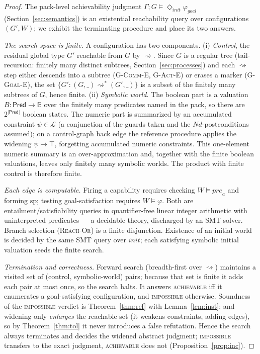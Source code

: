 \documentclass{article}
\theoremstyle{plain}
\theoremstyle{definition}
\newcommand{\reach}{\rightsquigarrow}
\newcommand{\reachs}{\reach^{*}}
\newcommand{\Pred}{\mathsf{Pred}}
\newcommand{\pre}{\mathit{pre}}
\newcommand{\Nd}{\mathit{Nd}}
\newcommand{\seither}{\mathrm{sp}}
\newcommand{\gphi}{\varphi_{\mathit{goal}}}
\newcommand{\achinit}{\vDash\Diamond_{\mathit{init}}}
\def \bgc {}
\def \egc {}
\begin{document}
\begin{proof}
The pack-level achievability judgment $\Gamma;G\achinit\gphi$
(Section~\ref{sec:semantics}) is an existential reachability query over
configurations $(G',W)$; \bgc we exhibit the terminating procedure and place
its two answers\egc.

\emph{The search space is finite.} A configuration has two components.
(i) \emph{Control}, the residual global type $G'$ reachable from $G$ by
$\reach$. Since $G$ is a regular tree (tail-recursion: finitely many distinct
subtrees, Section~\ref{sec:processes}) and each $\reach$ step either descends
into a subtree
(\textsc{G-Comm-E}, \textsc{G-Act-E}) or erases a marker (\textsc{G-Goal-E}), the set
$\{G' : (G,\_)\reachs(G',\_)\}$ is a subset of the finitely many subtrees of $G$,
hence finite. (ii) \emph{Symbolic world}. The boolean part is a valuation
$B:\Pred\to\mathbb B$ over the finitely many predicates named in the pack, so there
are $2^{|\Pred|}$ boolean states. The numeric part is summarized by an accumulated
constraint $\psi\in\mathcal L$ (a conjunction of the guards taken and the
$\Nd$-postconditions assumed); on a control-graph back edge the reference
procedure applies the widening $\psi\mapsto\top$, forgetting accumulated numeric
constraints. This one-element numeric summary is an over-approximation and,
together with the finite boolean valuations, leaves only finitely many symbolic
worlds. The product with finite control is therefore finite.

\emph{Each edge is computable.} Firing a capability requires checking $W\vDash
\pre_a$ and forming $\seither$; testing goal-satisfaction requires $W\vDash\varphi$.
Both are entailment/satisfiability queries in quantifier-free linear integer
arithmetic with uninterpreted predicates --- a decidable theory, discharged by an
SMT solver. Branch selection (\textsc{Reach-Or}) is a finite disjunction.
Existence of an initial world is decided by the same SMT query over
$\mathit{init}$; each satisfying symbolic initial valuation seeds the finite
search.

\emph{Termination and correctness.} Forward search (breadth-first over $\reach$)
maintains a visited set of (control, symbolic-world) pairs; because that set is
finite it adds each pair at most once, so the search halts. It answers
\textsc{achievable} iff it enumerates a goal-satisfying configuration, and
\textsc{impossible} otherwise. Soundness of the \textsc{impossible} verdict is
Theorem~\ref{thm:ref} \bgc with Lemma~\ref{lem:inst}\egc; and widening only \emph{enlarges} the reachable set (it
weakens constraints, adding edges), so by Theorem~\ref{thm:tol} it never
introduces a false refutation. \bgc Hence the search always terminates and
decides the widened abstract judgment; \textsc{impossible} transfers to the
exact judgment, \textsc{achievable} does not (Proposition~\ref{prop:inc}).\egc
\end{proof}
\end{document}
